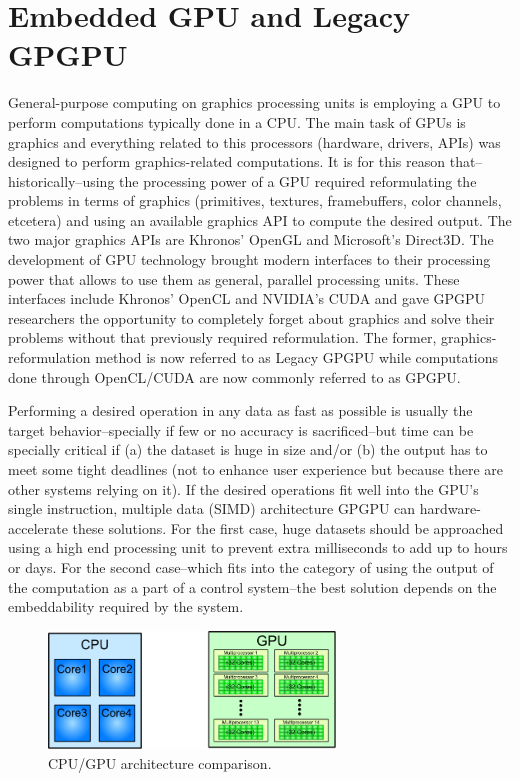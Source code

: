 \documentclass[conference]{IEEEtran}
\begin{document}
\section{Embedded GPU and Legacy GPGPU}
General-purpose computing on graphics processing units is employing a GPU to perform computations typically done in a CPU. The main task of GPUs is graphics and everything related to this processors (hardware, drivers, APIs) was designed to perform graphics-related computations. It is for this reason that--historically--using the processing power of a GPU required reformulating the problems in terms of graphics (primitives, textures, framebuffers, color channels, etcetera) and using an available graphics API to compute the desired output. The two major graphics APIs are Khronos' OpenGL and Microsoft's Direct3D. The development of GPU technology brought modern interfaces to their processing power that allows to use them as general, parallel processing units. These interfaces include Khronos' OpenCL and NVIDIA's CUDA and gave GPGPU researchers the opportunity to completely forget about graphics and solve their problems without that previously required reformulation. The former, graphics-reformulation method is now referred to as Legacy GPGPU while computations done through OpenCL/CUDA are now commonly referred to as GPGPU.

Performing a desired operation in any data as fast as possible is usually the target behavior--specially if few or no accuracy is sacrificed--but time can be specially critical if (a) the dataset is huge in size and/or (b) the output has to meet some tight deadlines (not to enhance user experience but because there are other systems relying on it). If the desired operations fit well into the GPU's single instruction, multiple data (SIMD) architecture GPGPU can hardware-accelerate these solutions. For the first case, huge datasets should be approached using a high end processing unit to prevent extra milliseconds to add up to hours or days. For the second case--which fits into the category of using the output of the computation as a part of a control system--the best solution depends on the embeddability required by the system.

\begin{figure}[!t]
 \centering
 \includegraphics[width=3.0in]{cpu_vs_gpu}
 \caption{CPU/GPU architecture comparison.}
 \label{fig:cpu_vs_gpu}
\end{figure}
\end{document}
